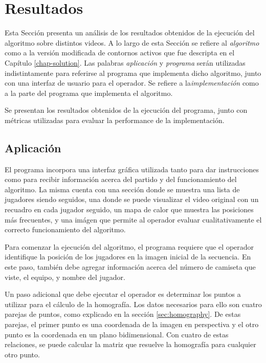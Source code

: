\chapter{Resultados}
\label{chap-results}

Esta Sección presenta un análisis de los resultados obtenidos de la ejecución
del algoritmo sobre distintos videos. A lo largo de esta Sección se refiere al
\textit{algoritmo} como a la versión modificada de contornos activos que fue
descripta en el Capítulo \ref{chap-solution}. Las palabras \textit{aplicación}
y \textit{programa} serán utilizadas indistintamente para referirse al programa
que implementa dicho algoritmo, junto con una interfaz de usuario para el
operador. Se refiere a la\textit{implementación} como a la parte del programa
que implementa el algoritmo.

Se presentan los resultados obtenidos de la ejecución del programa, junto con
métricas utilizadas para evaluar la performance de la implementación.

\section{Aplicación}

El programa incorpora una interfaz gráfica utilizada tanto para dar
instrucciones como para recibir información acerca del partido y del
funcionamiento del algoritmo. La misma cuenta con una sección donde se muestra
una lista de jugadores siendo seguidos, una donde se puede visualizar el video
original con un recuadro en cada jugador seguido, un mapa de calor que muestra
las posiciones más frecuentes, y una imágen que permite al operador evaluar
cualitativamente el correcto funcionamiento del algoritmo.

Para comenzar la ejecución del algoritmo, el programa requiere que el operador
identifique la posición de los jugadores en la imagen inicial de la secuencia.
En este paso, también debe agregar información acerca del número de camiseta
que viste, el equipo, y nombre del jugador.

Un paso adicional que debe ejecutar el operador es determinar los puntos a
utilizar para el cálculo de la homografía. Los datos necesarios para ello son
cuatro parejas de puntos, como explicado en la sección \ref{sec:homography}. De
estas parejas, el primer punto es una coordenada de la imagen en perspectiva y
el otro punto es la coordenada en un plano bidimensional. Con cuatro de estas
relaciones, se puede calcular la matriz que resuelve la homografía para
cualquier otro punto.  

